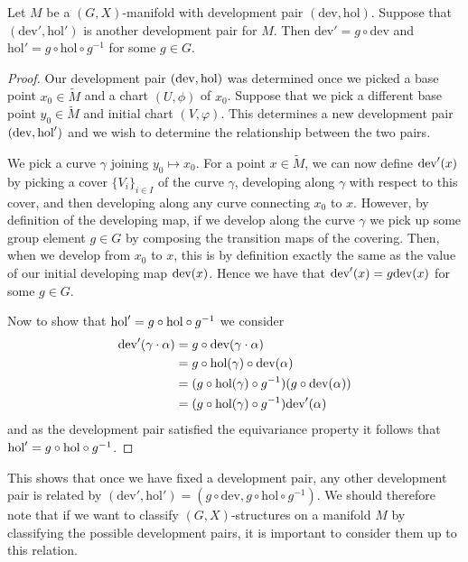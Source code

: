 \begin{lemma}
    Let $M$ be a $(G,X)$-manifold with development pair $(\text{dev}, \text{hol})$. Suppose that $(\text{dev}', \text{hol}')$ is
    another development pair for $M$. Then $\text{dev}' = g\circ \text{dev}$ and $\text{hol}' = g\circ \text{hol}\circ g^{-1}$
    for some $g \in G$. \label{lemma:equivalent-dev-pair}
\end{lemma}
\begin{proof}
    Our development pair $(\text{dev}, \text{hol})$ was determined once we picked a base point $x_0 \in \tilde{M}$ and a chart $(U, \phi)$ of $x_0$. Suppose that
    we pick a different base point $y_0 \in \tilde{M}$ and initial chart $(V, \varphi)$. This determines a new development pair $(\text{dev}, \text{hol}')$ and we wish to determine the relationship between the two pairs.

    We pick a curve $\gamma$ joining $y_0 \mapsto x_0$. For a point $x \in
        \tilde{M}$, we can now define $\text{dev}'(x)$ by picking a cover $\{V_i\}_{i \in I}$
    of the curve $\gamma$, developing along $\gamma$ with respect to this cover,
    and then developing along any curve connecting $x_0$ to $x$. However, by
    definition of the developing map, if we develop along the curve $\gamma$ we
    pick up some group element $g \in G$ by composing the transition maps of the
    covering. Then, when we develop from $x_0$ to $x$, this is by definition
    exactly the same as the value of our initial developing map $\text{dev}(x)$. Hence we
    have that $\text{dev}'(x) = g \text{dev}(x)$ for some $g \in G$.

    Now to show that $\text{hol}' = g\circ \text{hol}\circ g^{-1}$ we consider
    \begin{align*}
        \text{dev}'(\gamma \cdot \alpha) & = g \circ \text{dev}(\gamma \cdot \alpha)                            \\
                                   & = g\circ \text{hol}(\gamma) \circ \text{dev}(\alpha)                 \\
                                   & = (g\circ \text{hol}(\gamma)\circ g^{-1})(g\circ \text{dev}(\alpha)) \\
                                   & = (g \circ \text{hol}(\gamma)\circ g^{-1})\text{dev}'(\alpha)
    \end{align*}
    and as the development pair satisfied the equivariance property it follows that
    $\text{hol}' = g\circ \text{hol}\circ g^{-1}$.
\end{proof}

This shows that once we have fixed a development pair, any other development
pair is related by $(\text{dev}', \text{hol}') = (g\circ \text{dev}, g\circ
    \text{hol}\circ g^{-1})$. We should therefore note that if we want to classify
$(G,X)$-structures on a manifold $M$ by classifying the possible development
pairs, it is important to consider them up to this relation.

